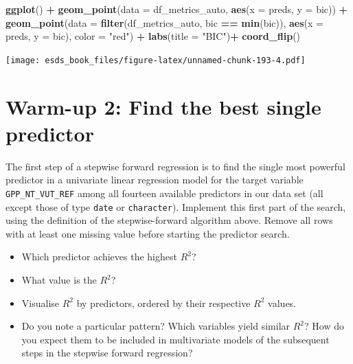 \documentclass[
]{book}
\newenvironment{Shaded}{\begin{snugshade}}{\end{snugshade}}
\newcommand{\DataTypeTok}[1]{\textcolor[rgb]{0.13,0.29,0.53}{#1}}
\newcommand{\KeywordTok}[1]{\textcolor[rgb]{0.13,0.29,0.53}{\textbf{#1}}}
\newcommand{\NormalTok}[1]{#1}
\newcommand{\OperatorTok}[1]{\textcolor[rgb]{0.81,0.36,0.00}{\textbf{#1}}}
\newcommand{\StringTok}[1]{\textcolor[rgb]{0.31,0.60,0.02}{#1}}
\providecommand{\tightlist}{%
  \setlength{\itemsep}{0pt}\setlength{\parskip}{0pt}}
\begin{document}
\begin{Shaded}
\begin{Highlighting}[]
\KeywordTok{ggplot}\NormalTok{() }\OperatorTok{+}
\StringTok{  }\KeywordTok{geom_point}\NormalTok{(}\DataTypeTok{data =}\NormalTok{ df_metrics_auto, }\KeywordTok{aes}\NormalTok{(}\DataTypeTok{x =}\NormalTok{ preds, }\DataTypeTok{y =}\NormalTok{ bic)) }\OperatorTok{+}
\StringTok{  }\KeywordTok{geom_point}\NormalTok{(}\DataTypeTok{data =} \KeywordTok{filter}\NormalTok{(df_metrics_auto, bic }\OperatorTok{==}\StringTok{ }\KeywordTok{min}\NormalTok{(bic)), }\KeywordTok{aes}\NormalTok{(}\DataTypeTok{x =}\NormalTok{ preds, }\DataTypeTok{y =}\NormalTok{ bic), }\DataTypeTok{color =} \StringTok{"red"}\NormalTok{) }\OperatorTok{+}
\StringTok{  }\KeywordTok{labs}\NormalTok{(}\DataTypeTok{title =} \StringTok{"BIC"}\NormalTok{)}\OperatorTok{+}\StringTok{ }
\StringTok{  }\KeywordTok{coord_flip}\NormalTok{()}
\end{Highlighting}
\end{Shaded}

\texttt{[image: esds\_book\_files/figure-latex/unnamed-chunk-193-4.pdf]}

\hypertarget{warm-up-2-find-the-best-single-predictor-1}{%
\section{Warm-up 2: Find the best single predictor}\label{warm-up-2-find-the-best-single-predictor-1}}

The first step of a stepwise forward regression is to find the single most powerful predictor in a univariate linear regression model for the target variable \texttt{GPP\_NT\_VUT\_REF} among all fourteen available predictors in our data set (all except those of type \texttt{date} or \texttt{character}). Implement this first part of the search, using the definition of the stepwise-forward algorithm above. Remove all rows with at least one missing value before starting the predictor search.

\begin{itemize}
\tightlist
\item
  Which predictor achieves the highest \(R^2\)?
\item
  What value is the \(R^2\)?
\item
  Visualise \(R^2\) by predictors, ordered by their respective \(R^2\) values.
\item
  Do you note a particular pattern? Which variables yield similar \(R^2\)? How do you expect them to be included in multivariate models of the subsequent steps in the stepwise forward regression?
\end{itemize}
\end{document}
